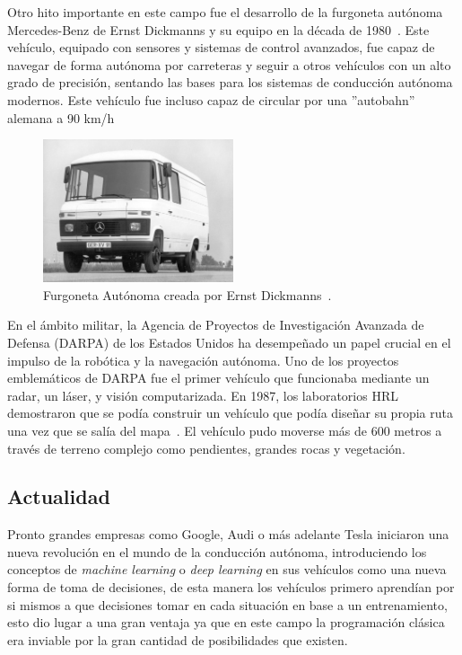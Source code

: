 Otro hito importante en este campo fue el desarrollo de la furgoneta autónoma Mercedes-Benz de Ernst Dickmanns y su equipo en la década de 
1980~\Cite{ernst80}. Este vehículo, equipado con sensores y sistemas de control avanzados, fue capaz de navegar de forma autónoma por 
carreteras y seguir a otros vehículos con un alto grado de precisión, sentando las bases para los sistemas de conducción autónoma modernos. 
Este vehículo fue   incluso capaz de circular por una ''autobahn'' alemana a 90 km/h

\begin{figure}[h]
    \centering
    \includegraphics[width=0.5\textwidth]{images/furgoneta_ernst_dickens.jpeg}
    \caption{Furgoneta Autónoma creada por Ernst Dickmanns~\cite{ernst80}.}
    \label{fig:furgoneta_ernst}
\end{figure}

En el ámbito militar, la Agencia de Proyectos de Investigación Avanzada de Defensa (DARPA) de los Estados Unidos ha desempeñado un 
papel crucial en el impulso de la robótica y la navegación autónoma. Uno de los proyectos emblemáticos de DARPA fue el primer vehículo 
que funcionaba mediante un radar, un láser, y visión computarizada. En 1987, los laboratorios HRL demostraron que se podía construir un 
vehículo que podía diseñar su propia ruta una vez que se salía del mapa~\cite{DARPA20}. El vehículo pudo moverse más de 600 metros a través de terreno 
complejo como pendientes, grandes rocas y vegetación.

\subsection{Actualidad}

Pronto grandes empresas como Google, Audi o más adelante Tesla iniciaron una nueva revolución en el mundo de la conducción autónoma, 
introduciendo los conceptos de \textit{machine learning} o \textit{deep learning} en sus vehículos como una nueva forma de toma de 
decisiones, de esta manera los vehículos primero aprendían por si mismos a que decisiones tomar en cada situación en base a un entrenamiento, 
esto dio lugar a una gran ventaja ya que en este campo la programación clásica era inviable por la gran cantidad de posibilidades que existen.

